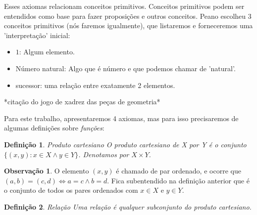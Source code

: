 \documentclass[
	12pt,				%
	oneside,			%
	a4paper,			%
	english,			%
	french,				%
	spanish,			%
	brazil,				%
	]{abntex2}
\theoremstyle{plain}
\newtheorem{defi}{Definição}[chapter]
\theoremstyle{definition}
\newtheorem{obs}{Observação}[chapter]
\begin{document}
Esses axiomas relacionam conceitos primitivos. Conceitos primitivos podem ser entendidos como base para fazer proposições e outros conceitos. Peano escolheu 3 conceitos primitivos (nós faremos igualmente), que listaremos e forneceremos uma 'interpretação' inicial:
\begin{itemize}
    \item $1$: Algum elemento.
    \item Número natural: Algo que é número e que podemos chamar de 'natural'.
    \item sucessor: uma relação entre exatamente 2 elementos.
\end{itemize}

*citação do jogo de xadrez das peças de geometria*


Para este trabalho, apresentaremos 4 axiomas, mas para isso precisaremos de algumas definições sobre \emph{funções}:

\begin{defi}{Produto cartesiano}
    O produto cartesiano de X por Y é o conjunto $\{(x,y) : x \in X \land y \in Y\}$. Denotamos por $X \times Y$.
\end{defi}
\begin{obs}
    O elemento $(x,y)$ é chamado de par ordenado, e ocorre que $(a,b) = (c,d) \iff a = c \land b = d$. Fica subentendido na definição anterior que é o conjunto de todos os pares ordenados com $x \in X$ e $y \in Y$.
\end{obs}

\begin{defi}{Relação}
    Uma relação é qualquer subconjunto do produto cartesiano.
\end{defi}
\end{document}
